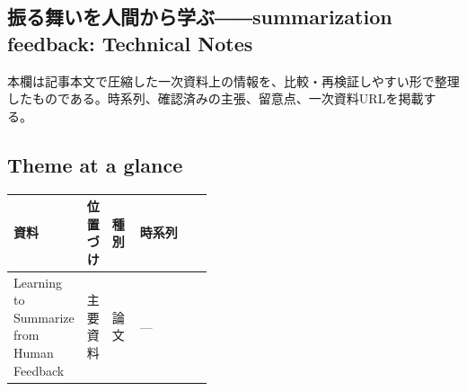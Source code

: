 \subsection*{振る舞いを人間から学ぶ――summarization feedback: Technical Notes}
本欄は記事本文で圧縮した一次資料上の情報を、比較・再検証しやすい形で整理したものである。時系列、確認済みの主張、留意点、一次資料URLを掲載する。
\smallskip
{}\par
\medskip
\subsection*{Theme at a glance}
\begin{center}
\footnotesize
\begin{tabularx}{\linewidth}{@{}p{0.20\linewidth}p{0.10\linewidth}p{0.14\linewidth}X@{}}
\toprule
資料 & 位置づけ & 種別 & 時系列 \\
\midrule
Learning to Summarize from Human Feedback & 主要資料 & 論文 & — \\
\bottomrule
\end{tabularx}
\end{center}
\normalsize

